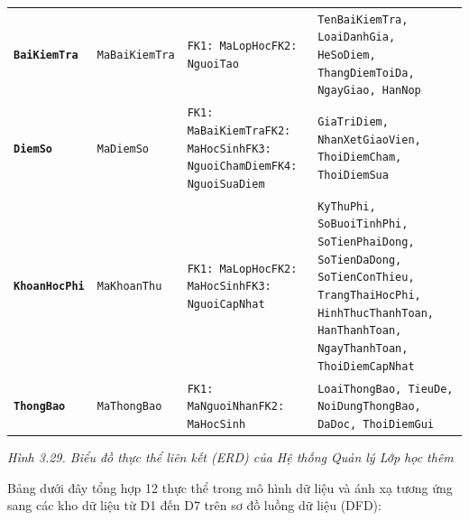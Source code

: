 \documentclass[12pt,a4paper]{article}
\begin{document}
\begin{center}
{{\begin{tabularx}{\linewidth}{@{}p{2.1cm} p{2.1cm} >{\raggedright\arraybackslash}p{3.2cm} >{\raggedright\arraybackslash}X@{}}
\addlinespace[2pt]
\textbf{\texttt{BaiKiemTra}} & \texttt{MaBaiKiemTra} & \texttt{FK1: MaLopHoc}\newline \texttt{FK2: NguoiTao} & \texttt{TenBaiKiemTra, LoaiDanhGia, HeSoDiem, ThangDiemToiDa, NgayGiao, HanNop} \\
\addlinespace[2pt]
\textbf{\texttt{DiemSo}} & \texttt{MaDiemSo} & \texttt{FK1: MaBaiKiemTra}\newline \texttt{FK2: MaHocSinh}\newline \texttt{FK3: NguoiChamDiem}\newline \texttt{FK4: NguoiSuaDiem} & \texttt{GiaTriDiem, NhanXetGiaoVien, ThoiDiemCham, ThoiDiemSua} \\
\addlinespace[2pt]
\textbf{\texttt{KhoanHocPhi}} & \texttt{MaKhoanThu} & \texttt{FK1: MaLopHoc}\newline \texttt{FK2: MaHocSinh}\newline \texttt{FK3: NguoiCapNhat} & \texttt{KyThuPhi, SoBuoiTinhPhi, SoTienPhaiDong, SoTienDaDong, SoTienConThieu, TrangThaiHocPhi, HinhThucThanhToan, HanThanhToan, NgayThanhToan, ThoiDiemCapNhat} \\
\addlinespace[2pt]
\textbf{\texttt{ThongBao}} & \texttt{MaThongBao} & \texttt{FK1: MaNguoiNhan}\newline \texttt{FK2: MaHocSinh} & \texttt{LoaiThongBao, TieuDe, NoiDungThongBao, DaDoc, ThoiDiemGui} \\
\bottomrule
\end{tabularx}
\vspace{4pt}
\normalsize\textit{Hình 3.29. Biểu đồ thực thể liên kết (ERD) của Hệ thống Quản lý Lớp học thêm}
\vspace{2pt}
}}
\end{center}

Bảng dưới đây tổng hợp 12 thực thể trong mô hình dữ liệu và ánh xạ tương ứng sang các kho dữ liệu từ D1 đến D7 trên sơ đồ luồng dữ liệu (DFD):
\end{document}
